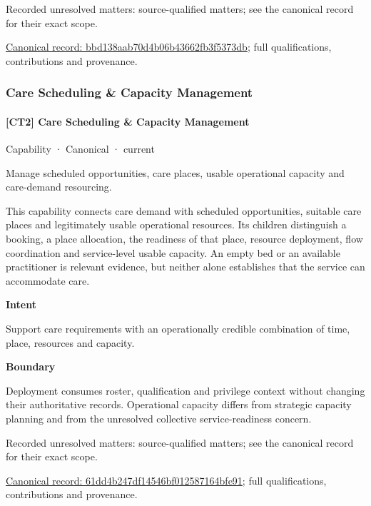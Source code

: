 {\small Recorded unresolved matters: source-qualified matters; see the canonical record for their exact scope.}\par
{\footnotesize \href{../../../../continuum/strategy/capability/bbd138aab70d4b06b43662fb3f5373db.md}{Canonical record: bbd138aab70d4b06b43662fb3f5373db}; full qualifications, contributions and provenance.}\par
\subsubsection{Care Scheduling \& Capacity Management}

\paragraph{[CT2] Care Scheduling \& Capacity Management}

\label{element:61dd4b247df14546bf012587164bfe91}
{\small Capability · Canonical · current}\par

Manage scheduled opportunities, care places, usable operational capacity and care-demand resourcing.



This capability connects care demand with scheduled opportunities, suitable care places and legitimately usable operational resources. Its children distinguish a booking, a place allocation, the readiness of that place, resource deployment, flow coordination and service-level usable capacity. An empty bed or an available practitioner is relevant evidence, but neither alone establishes that the service can accommodate care.



\textbf{Intent}



Support care requirements with an operationally credible combination of time, place, resources and capacity.



\textbf{Boundary}



Deployment consumes roster, qualification and privilege context without changing their authoritative records. Operational capacity differs from strategic capacity planning and from the unresolved collective service-readiness concern.


{\small Recorded unresolved matters: source-qualified matters; see the canonical record for their exact scope.}\par
{\footnotesize \href{../../../../continuum/strategy/capability/61dd4b247df14546bf012587164bfe91.md}{Canonical record: 61dd4b247df14546bf012587164bfe91}; full qualifications, contributions and provenance.}\par
